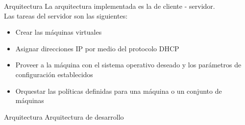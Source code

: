 \begin{frame}{Arquitectura}
    \vspace{-1.5cm}
    La arquitectura implementada es la de cliente - servidor. 
    \\
    Las tareas del servidor son las siguientes:
    \begin{itemize}
        \item Crear las máquinas virtuales
        \item Asignar direcciones IP por medio del protocolo DHCP
        \item Proveer a la máquina con el sistema operativo deseado y los parámetros de configuración establecidos
        \item Orquestar las políticas definidas para una máquina o un conjunto de máquinas
    \end{itemize}

\end{frame}

\begin{frame}{Arquitectura}
    \vspace{0cm} {Arquitectura de desarrollo}
    \vspace{0.5cm}
    \begin{figure}[ht]
       \centering
       \vspace{-0.50cm}
    \end{figure}

\end{frame}

